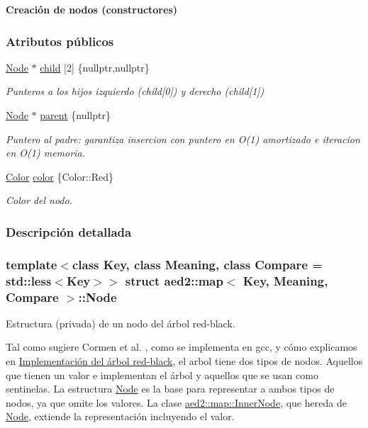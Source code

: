 \begin{Indent}{\bf \-Creación de nodos (constructores)}
\subsubsection*{Atributos públicos}
\begin{DoxyCompactItemize}
\item 
\hyperlink{structaed2_1_1map_1_1Node}{Node} $\ast$ \hyperlink{structaed2_1_1map_1_1Node_a7d65c374c73c443a46d8fc224aff9e82_a7d65c374c73c443a46d8fc224aff9e82}{child} \mbox{[}2\mbox{]} \{nullptr,nullptr\}
\begin{DoxyCompactList}\small\item\em Punteros a los hijos izquierdo (child\mbox{[}0\mbox{]}) y derecho (child\mbox{[}1\mbox{]}) \end{DoxyCompactList}\item 
\hyperlink{structaed2_1_1map_1_1Node}{Node} $\ast$ \hyperlink{structaed2_1_1map_1_1Node_ab6a5f9e471b311755e4a56834086cb90_ab6a5f9e471b311755e4a56834086cb90}{parent} \{nullptr\}
\begin{DoxyCompactList}\small\item\em Puntero al padre\+: garantiza insercion con puntero en O(1) amortizado e iteracion en O(1) memoria. \end{DoxyCompactList}\item 
\hyperlink{classaed2_1_1map_a6d62a415a4b9d320b30cada4ebcf9f5b_a6d62a415a4b9d320b30cada4ebcf9f5b}{Color} \hyperlink{structaed2_1_1map_1_1Node_a58dd9993fee8ee3eaa5716b72a3eca47_a58dd9993fee8ee3eaa5716b72a3eca47}{color} \{Color\+::\+Red\}
\begin{DoxyCompactList}\small\item\em Color del nodo. \end{DoxyCompactList}\end{DoxyCompactItemize}


\subsubsection{Descripción detallada}
\subsubsection*{template$<$class Key, class Meaning, class Compare = std\+::less$<$\+Key$>$$>$\newline
struct aed2\+::map$<$ Key, Meaning, Compare $>$\+::\+Node}

Estructura (privada) de un nodo del árbol red-\/black. 

Tal como sugiere Cormen et al. \cite{CormenLeisersonRivestStein2009}, como se implementa en gcc, y cómo explicamos en \hyperlink{Implementacion}{Implementación del árbol red-\/black}, el arbol tiene dos tipos de nodos. Aquellos que tienen un valor e implementan el árbol y aquellos que se usan como sentinelas. La estructura \hyperlink{structaed2_1_1map_1_1Node}{Node} es la base para representar a ambos tipos de nodos, ya que omite los valores. La clase \hyperlink{structaed2_1_1map_1_1InnerNode}{aed2\+::map\+::\+Inner\+Node}, que hereda de \hyperlink{structaed2_1_1map_1_1Node}{Node}, extiende la representación incluyendo el valor.


\end{Indent}
